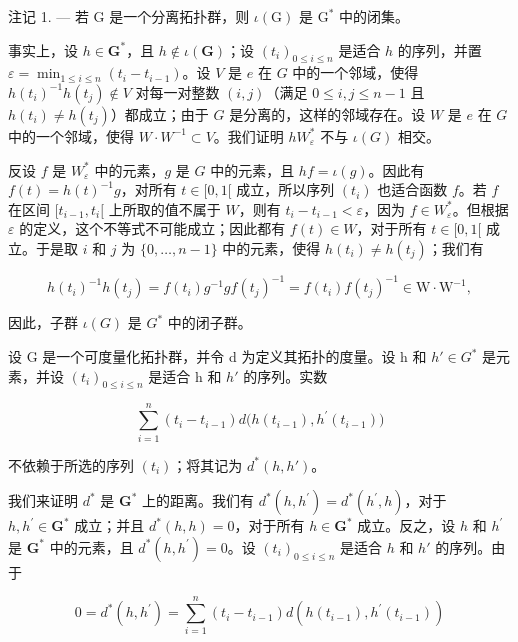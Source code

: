 注记 1. --- 若 G 是一个分离拓扑群，则 \(\iota(\mathrm{G})\) 是 \(\mathrm{G}^*\) 中的闭集。

事实上，设 \(h \in \mathbf{G}^*\)，且 \(h \notin \iota(\mathbf{G})\)；设 \((t_i)_{0 \leqslant i \leqslant n}\) 是适合 \(h\) 的序列，并置 \(\varepsilon = \min_{1 \leqslant i \leqslant n} (t_i - t_{i-1})\)。设 \(V\) 是 \(e\) 在 \(G\) 中的一个邻域，使得 \(h(t_i)^{-1}h(t_j) \notin V\) 对每一对整数 \((i,j)\)（满足 \(0 \leqslant i, j \leqslant n-1\) 且 \(h(t_i) \neq h(t_j)\)）都成立；由于 \(G\) 是分离的，这样的邻域存在。设 \(W\) 是 \(e\) 在 \(G\) 中的一个邻域，使得 \(W \cdot W^{-1} \subset V\)。我们证明 \(hW_\varepsilon^*\) 不与 \(\iota(G)\) 相交。

反设 \(f\) 是 \(W_{\varepsilon}^{*}\) 中的元素，\(g\) 是 \(G\) 中的元素，且 \(hf = \iota(g)\)。因此有 \(f(t) = h(t)^{-1}g\)，对所有 \(t \in [0,1[\) 成立，所以序列 \((t_i)\) 也适合函数 \(f\)。若 \(f\) 在区间 \([t_{i-1}, t_i[\) 上所取的值不属于 \(W\)，则有 \(t_i - t_{i-1} < \varepsilon\)，因为 \(f \in W_{\varepsilon}^{*}\)。但根据 \(\varepsilon\) 的定义，这个不等式不可能成立；因此都有 \(f(t) \in W\)，对于所有 \(t \in [0,1[\) 成立。于是取 \(i\) 和 \(j\) 为 \(\{0, \ldots, n-1\}\) 中的元素，使得 \(h(t_i) \neq h(t_j)\)；我们有

\[
h (t _ {i}) ^ {- 1} h (t _ {j}) = f (t _ {i}) g ^ {- 1} g f (t _ {j}) ^ {- 1} = f (t _ {i}) f (t _ {j}) ^ {- 1} \in \mathrm{W} \cdot \mathrm{W} ^ {- 1},
\]

因此，子群 \(\iota(G)\) 是 \(G^{*}\) 中的闭子群。

设 G 是一个可度量化拓扑群，并令 d 为定义其拓扑的度量。设 h 和 \(h' \in G^{*}\) 是元素，并设 \((t_{i})_{0 \leqslant i \leqslant n}\) 是适合 h 和 \(h'\) 的序列。实数

\[
\sum_ {i = 1} ^ {n} (t _ {i} - t _ {i - 1}) d \bigl (h (t _ {i - 1}), h ^ {\prime} (t _ {i - 1}) \bigr)
\]

不依赖于所选的序列 \((t_{i})\)；将其记为 \(d^{*}(h,h')\)。

我们来证明 \(d^{*}\) 是 \(\mathbf{G}^{*}\) 上的距离。我们有 \(d^{*}(h,h^{\prime}) = d^{*}(h^{\prime},h)\)，对于 \(h, h^{\prime} \in \mathbf{G}^{*}\) 成立；并且 \(d^{*}(h,h) = 0\)，对于所有 \(h \in \mathbf{G}^{*}\) 成立。反之，设 \(h\) 和 \(h^{\prime}\) 是 \(\mathbf{G}^{*}\) 中的元素，且 \(d^{*}(h,h^{\prime}) = 0\)。设 \((t_{i})_{0\leqslant i\leqslant n}\) 是适合 \(h\) 和 \(h'\) 的序列。由于

\[
0 = d ^ {*} (h, h ^ {\prime}) = \sum_ {i = 1} ^ {n} \left(t _ {i} - t _ {i - 1}\right) d \left(h \left(t _ {i - 1}\right), h ^ {\prime} \left(t _ {i - 1}\right)\right)
\]

